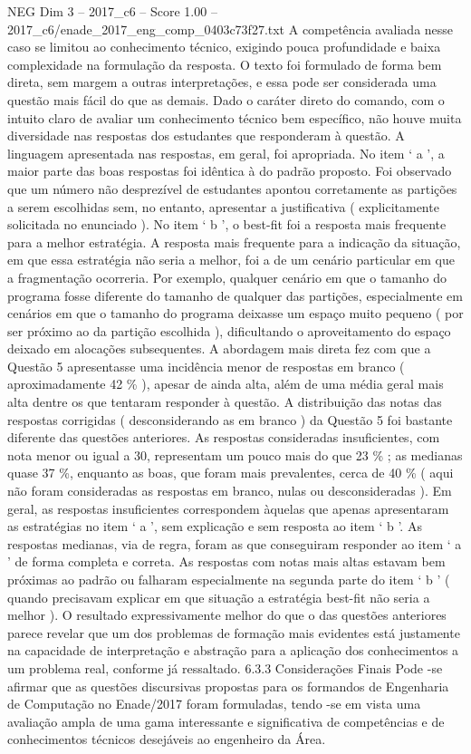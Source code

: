 \begin{textsample}{NEG Dim 3 – 2017\_c6 – Score 1.00 – 2017\_c6/enade\_2017\_eng\_comp\_0403c73f27.txt}
A competência avaliada nesse caso se limitou ao conhecimento técnico, exigindo pouca profundidade e baixa complexidade na formulação da resposta.
O texto foi formulado de forma bem direta, sem margem a outras interpretações, e essa pode ser considerada uma questão mais fácil do que as demais.
Dado o caráter direto do comando, com o intuito claro de avaliar um conhecimento técnico bem específico, não houve muita diversidade nas respostas dos estudantes que responderam à questão.
A linguagem apresentada nas respostas, em geral, foi apropriada.
No item ‘ a ’, a maior parte das boas respostas foi idêntica à do padrão proposto.
Foi observado que um número não desprezível de estudantes apontou corretamente as partições a serem escolhidas sem, no entanto, apresentar a justificativa ( explicitamente solicitada no enunciado ).
No item ‘ b ’, o best-fit foi a resposta mais frequente para a melhor estratégia.
A resposta mais frequente para a indicação da situação, em que essa estratégia não seria a melhor, foi a de um cenário particular em que a fragmentação ocorreria.
Por exemplo, qualquer cenário em que o tamanho do programa fosse diferente do tamanho de qualquer das partições, especialmente em cenários em que o tamanho do programa deixasse um espaço muito pequeno ( por ser próximo ao da partição escolhida ), dificultando o aproveitamento do espaço deixado em alocações subsequentes.
A abordagem mais direta fez com que a Questão 5 apresentasse uma incidência menor de respostas em branco ( aproximadamente 42 \% ), apesar de ainda alta, além de uma média geral mais alta dentre os que tentaram responder à questão.
A distribuição das notas das respostas corrigidas ( desconsiderando as em branco ) da Questão 5 foi bastante diferente das questões anteriores.
As respostas consideradas insuficientes, com nota menor ou igual a 30, representam um pouco mais do que 23 \% ; as medianas quase 37 \%, enquanto as boas, que foram mais prevalentes, cerca de 40 \% ( aqui não foram consideradas as respostas em branco, nulas ou desconsideradas ).
Em geral, as respostas insuficientes correspondem àquelas que apenas apresentaram as estratégias no item ‘ a ’, sem explicação e sem resposta ao item ‘ b ’.
As respostas medianas, via de regra, foram as que conseguiram responder ao item ‘ a ’ de forma completa e correta.
As respostas com notas mais altas estavam bem próximas ao padrão ou falharam especialmente na segunda parte do item ‘ b ’ ( quando precisavam explicar em que situação a estratégia best-fit não seria a melhor ).
O resultado expressivamente melhor do que o das questões anteriores parece revelar que um dos problemas de formação mais evidentes está justamente na capacidade de interpretação e abstração para a aplicação dos conhecimentos a um problema real, conforme já ressaltado. 6.3.3 Considerações Finais Pode -se afirmar que as questões discursivas propostas para os formandos de Engenharia de Computação no Enade/2017 foram formuladas, tendo -se em vista uma avaliação ampla de uma gama interessante e significativa de competências e de conhecimentos técnicos desejáveis ao engenheiro da Área.

\end{textsample}
